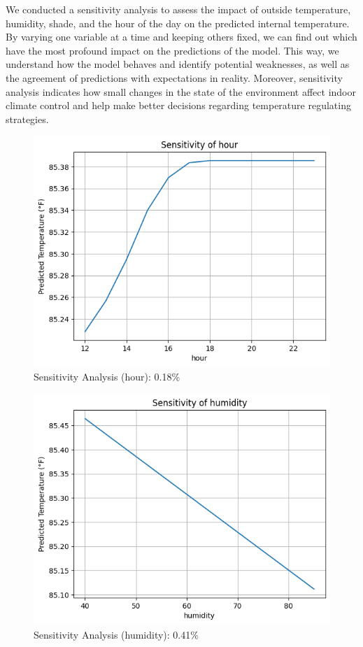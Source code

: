 \documentclass[12pt]{article}
\begin{document}
\par We conducted a sensitivity analysis to assess the impact of outside temperature, humidity, shade, and the hour of the day on the predicted internal temperature. By varying one variable at a time and keeping others fixed, we can find out which have the most profound impact on the predictions of the model. This way, we understand how the model behaves and identify potential weaknesses, as well as the agreement of predictions with expectations in reality. Moreover, sensitivity analysis indicates how small changes in the state of the environment affect indoor climate control and help make better decisions regarding temperature regulating strategies. 
\begin{figure}
    \centering
    \includegraphics[scale=0.6]{hour.png}
    \caption{Sensitivity Analysis (hour): 0.18\% } 
    \label{fig:sensitivityHour}
\end{figure}
\begin{figure}
    \centering
    \includegraphics[scale=0.55]{humidity.png}
    \caption{Sensitivity Analysis (humidity): 0.41\%}  
    \label{fig:sensitivityHumidity}
\end{figure}
\end{document}
